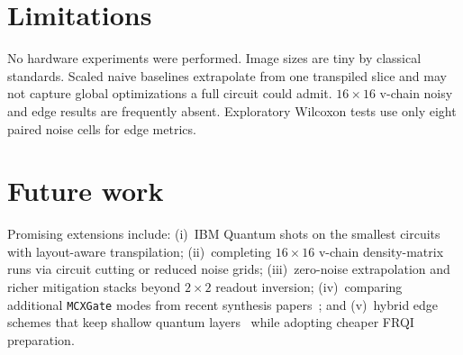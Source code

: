 \section{Limitations}
No hardware experiments were performed. Image sizes are tiny by classical standards. Scaled naive baselines extrapolate from one transpiled slice and may not capture global optimizations a full circuit could admit. $16\times 16$ v-chain noisy and edge results are frequently absent. Exploratory Wilcoxon tests use only eight paired noise cells for edge metrics.

\section{Future work}
Promising extensions include: (i)~IBM Quantum shots on the smallest circuits with layout-aware transpilation; (ii)~completing $16\times 16$ v-chain density-matrix runs via circuit cutting or reduced noise grids; (iii)~zero-noise extrapolation and richer mitigation stacks beyond $2\times 2$ readout inversion; (iv)~comparing additional \texttt{MCXGate} modes from recent synthesis papers~\cite{Arsoski2024MCXQFT,Zindorf2024EfficientMCG}; and (v)~hybrid edge schemes that keep shallow quantum layers~\cite{Geng2022HybridNISQEdge,Shubha2024EdgeDetectionQuantumized} while adopting cheaper FRQI preparation.
